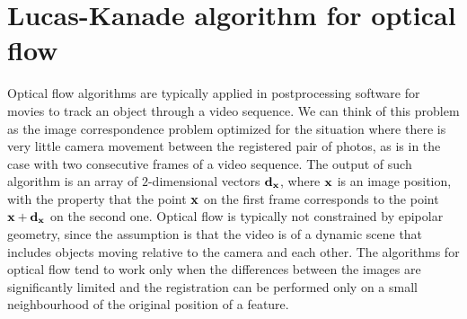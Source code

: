 




\section{Lucas-Kanade algorithm for optical flow} 

Optical flow algorithms are typically applied in postprocessing software for movies to track an object through a video sequence. 
We can think of this problem as the image correspondence problem optimized for the situation where there is very little camera movement between the registered pair of photos, as is in the case with two consecutive frames of a video sequence. 
The output of such algorithm is an array of $2$-dimensional vectors $\mathbf{d}_{\mathbf{x}}$, where $\mathbf{x}$ is an image position, with the property that the point $\mathbf{x}$ on the first frame corresponds to the point $\mathbf{x} + \mathbf{d}_{\mathbf{x}}$ on the second one. 
Optical flow is typically not constrained by epipolar geometry, since the assumption is that the video is of a dynamic scene that includes objects moving relative to the camera and each other.
The algorithms for optical flow tend to work only when the differences between the images are significantly limited and the registration can be performed only on a small neighbourhood of the original position of a feature. 

